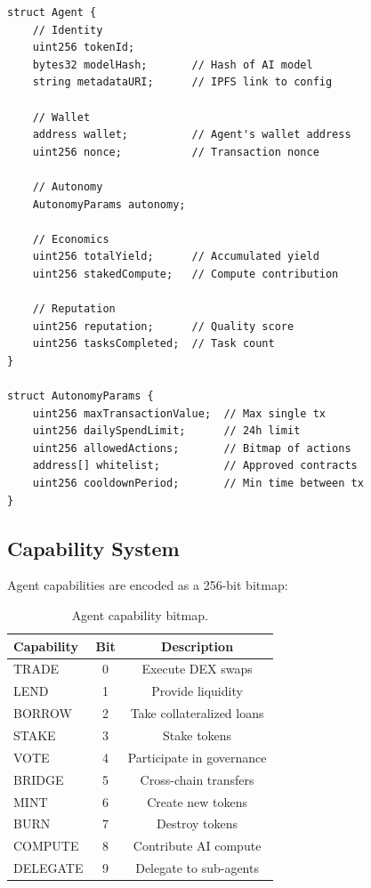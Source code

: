 \documentclass[11pt,letterpaper]{article}
\begin{document}
\begin{lstlisting}[language=Solidity,caption=Agent Data Structure]
struct Agent {
    // Identity
    uint256 tokenId;
    bytes32 modelHash;       // Hash of AI model
    string metadataURI;      // IPFS link to config

    // Wallet
    address wallet;          // Agent's wallet address
    uint256 nonce;           // Transaction nonce

    // Autonomy
    AutonomyParams autonomy;

    // Economics
    uint256 totalYield;      // Accumulated yield
    uint256 stakedCompute;   // Compute contribution

    // Reputation
    uint256 reputation;      // Quality score
    uint256 tasksCompleted;  // Task count
}

struct AutonomyParams {
    uint256 maxTransactionValue;  // Max single tx
    uint256 dailySpendLimit;      // 24h limit
    uint256 allowedActions;       // Bitmap of actions
    address[] whitelist;          // Approved contracts
    uint256 cooldownPeriod;       // Min time between tx
}
\end{lstlisting}

\subsection{Capability System}

Agent capabilities are encoded as a 256-bit bitmap:

\begin{table}[t]
\centering
\begin{tabular}{lcc}
\toprule
\textbf{Capability} & \textbf{Bit} & \textbf{Description} \\
\midrule
TRADE & 0 & Execute DEX swaps \\
LEND & 1 & Provide liquidity \\
BORROW & 2 & Take collateralized loans \\
STAKE & 3 & Stake tokens \\
VOTE & 4 & Participate in governance \\
BRIDGE & 5 & Cross-chain transfers \\
MINT & 6 & Create new tokens \\
BURN & 7 & Destroy tokens \\
COMPUTE & 8 & Contribute AI compute \\
DELEGATE & 9 & Delegate to sub-agents \\
\bottomrule
\end{tabular}
\caption{Agent capability bitmap.}
\label{tab:capabilities}
\end{table}
\end{document}
